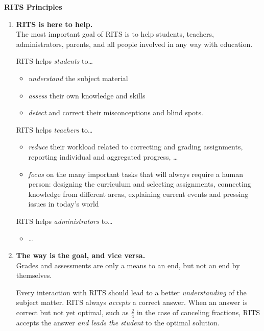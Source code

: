 \documentclass[a4paper,11pt]{article}
\begin{document}
\noindent
\begin{center}
\Large\textbf{RITS Principles}
\end{center}

\vspace{1cm}

\begin{enumerate}
\item \textbf{RITS is here to help.}\\
  The most important goal of RITS is to help students, teachers,
  administrators, parents, and all people involved in any way with
  education.

  \bigskip\noindent
  RITS helps \textit{students} to\dots
  \begin{itemize}
  \item \textit{understand} the subject material
  \item \textit{assess} their own knowledge and skills
  \item \textit{detect} and correct their misconceptions and blind spots.
  \end{itemize}

  \bigskip\noindent
  RITS helps \textit{teachers} to\dots
  \begin{itemize}
  \item \textit{reduce} their workload related to correcting and grading
    assignments, reporting individual and aggregated progress, \dots
  \item \textit{focus} on the many important tasks that will always require a
    human person: designing the curriculum and selecting assignments,
    connecting knowledge from different areas, explaining current
    events and pressing issues in today's world
  \end{itemize}
  \bigskip\noindent
  
  RITS helps \textit{administrators} to\dots
  \begin{itemize}
  \item \dots
  \end{itemize}

\item \textbf{The way is the goal, and vice versa.}\\
  Grades and assessments are only a means to an end, but not an end by
  themselves.

  Every interaction with RITS should lead to a better
  \textit{understanding} of the subject matter. RITS always
  \textit{accepts} a correct answer. When an answer is correct but not
  yet optimal, such as $\frac{2}{4}$ in the case of canceling
  fractions, RITS accepts the answer \textit{and leads the student} to
  the optimal solution.
    
  \end{enumerate}

\vfil
\end{document}
